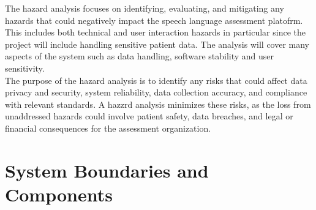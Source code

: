 \documentclass{article}
\begin{document}
\hspace{1.5em} The hazard analysis focuses on identifying, evaluating, and mitigating any hazards that could negatively 
impact the speech language assessment platofrm. This includes both technical and user interaction hazards in particular 
since the project will include handling sensitive patient data. The analysis will cover many aspects of the system such as 
data handling, software stability and user sensitivity. \\
\indent The purpose of the hazard analysis is to identify any risks that could 
affect data privacy and security, system reliability, data collection accuracy, and compliance with relevant standards. A 
hazzrd analysis minimizes these risks, as the loss from unaddressed hazards could involve patient safety, data breaches, 
and legal or financial consequences for the assessment organization.

\section{System Boundaries and Components}
\end{document}
